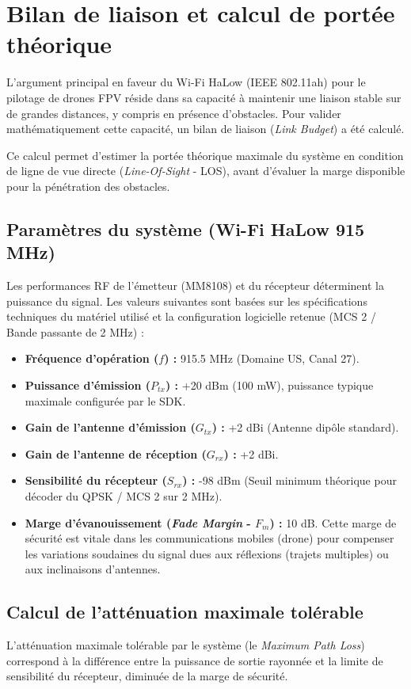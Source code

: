 \section{Bilan de liaison et calcul de portée théorique}

L'argument principal en faveur du Wi-Fi HaLow (IEEE 802.11ah) pour le pilotage de drones FPV réside 
dans sa capacité à maintenir une liaison stable sur de grandes distances, y compris en présence 
d'obstacles. Pour valider mathématiquement cette capacité, un bilan de liaison (\textit{Link Budget}) a 
été calculé.

Ce calcul permet d'estimer la portée théorique maximale du système en condition de ligne de vue directe 
(\textit{Line-Of-Sight} - LOS), avant d'évaluer la marge disponible pour la pénétration des obstacles.

\subsection{Paramètres du système (Wi-Fi HaLow 915 MHz)}
Les performances RF de l'émetteur (MM8108) et du récepteur déterminent la puissance du signal. Les valeurs 
suivantes sont basées sur les spécifications techniques du matériel utilisé et la configuration logicielle 
retenue (MCS 2 / Bande passante de 2 MHz) :

\begin{itemize}
    \item \textbf{Fréquence d'opération ($f$) :} 915.5 MHz (Domaine US, Canal 27).
    \item \textbf{Puissance d'émission ($P_{tx}$) :} +20 dBm (100 mW), puissance typique maximale configurée 
    par le SDK.
    \item \textbf{Gain de l'antenne d'émission ($G_{tx}$) :} +2 dBi (Antenne dipôle standard).
    \item \textbf{Gain de l'antenne de réception ($G_{rx}$) :} +2 dBi.
    \item \textbf{Sensibilité du récepteur ($S_{rx}$) :} -98 dBm (Seuil minimum théorique pour décoder du 
    QPSK / MCS 2 sur 2 MHz).
    \item \textbf{Marge d'évanouissement (\textit{Fade Margin} - $F_m$) :} 10 dB. Cette marge de sécurité 
    est vitale dans les communications mobiles (drone) pour compenser les variations soudaines du signal dues 
    aux réflexions (trajets multiples) ou aux inclinaisons d'antennes.
\end{itemize}

\subsection{Calcul de l'atténuation maximale tolérable}
L'atténuation maximale tolérable par le système (le \textit{Maximum Path Loss}) correspond à la différence 
entre la puissance de sortie rayonnée et la limite de sensibilité du récepteur, diminuée de la marge de sécurité.

